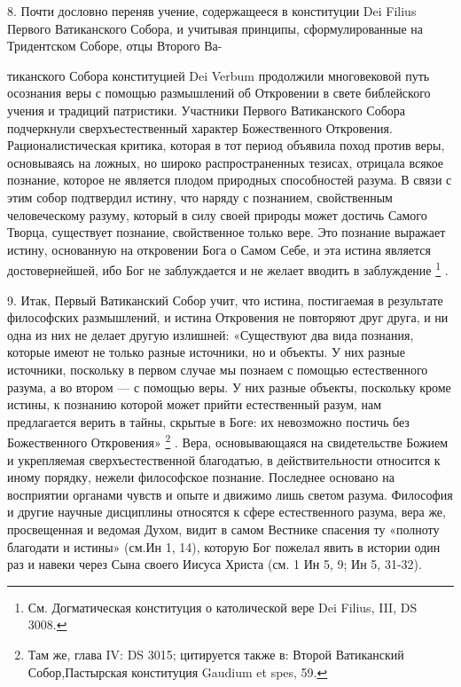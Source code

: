 \documentclass[a5paper,10pt]{article}
\begin{document}
8. Почти дословно переняв учение, содержащееся в конституции Dei Filius Первого
Ватиканского Собора, и учитывая принципы, сформулированные на Тридентском
Соборе, отцы Второго Ва-

тиканского Собора конституцией Dei Verbum продолжили многовековой путь
осознания веры с помощью размышлений об Откровении в свете библейского учения и
традиций патристики. Участники Первого Ватиканского Собора подчеркнули
сверхъестественный характер Божественного Откровения. Рационалистическая
критика, которая в тот период объявила поход против веры, основываясь на
ложных, но широко распространенных тезисах, отрицала всякое познание, которое
не является плодом природных способностей разума. В связи с этим собор
подтвердил истину, что наряду с познанием, свойственным человеческому разуму,
который в силу своей природы может достичь Самого Творца, существует познание,
свойственное только вере. Это познание выражает истину, основанную на
откровении Бога о Самом Себе, и эта истина является достовернейшей, ибо Бог не
заблуждается и не желает вводить в заблуждение \footnote{См. Догматическая конституция о католической вере Dei Filius, III, DS 3008.} .

9. Итак, Первый Ватиканский Собор учит, что истина, постигаемая в результате
философских размышлений, и истина Откровения не повторяют друг друга, и ни одна
из них не делает другую излишней: «Существуют два вида познания, которые имеют
не только разные источники, но и объекты. У них разные источники, поскольку в
первом случае мы познаем с помощью естественного разума, а во втором — с
помощью веры. У них разные объекты, поскольку кроме истины, к познанию которой
может прийти естественный разум, нам предлагается верить в тайны, скрытые в
Боге: их невозможно постичь без Божественного Откровения» \footnote{Там же,
глава IV: DS 3015; цитируется также в: Второй Ватиканский Собор,Пастырская
конституция Gaudium et spes, 59.} . Вера, основывающаяся на свидетельстве
Божием и укрепляемая сверхъестественной благодатью, в действительности
относится к иному порядку, нежели философское познание. Последнее основано на
восприятии органами чувств и опыте и движимо лишь светом разума. Философия и
другие научные дисциплины относятся к сфере естественного разума, вера же,
просвещенная и ведомая Духом, видит в самом Вестнике спасения ту «полноту
благодати и истины» (см.Ин 1, 14), которую Бог пожелал явить в истории один раз
и навеки через Сына своего Иисуса Христа (см.  1 Ин 5, 9; Ин 5, 31-32).
\end{document}
